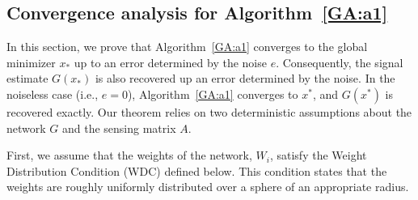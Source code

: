 




\subsection{Convergence analysis for Algorithm~\ref{GA:a1}}

In this section, we prove that Algorithm~\ref{GA:a1} converges to the global minimizer $x_*$ up to an error determined by the noise $e$.  Consequently, the signal estimate $G(x_*)$ is also recovered up an error determined by the noise. In the noiseless case (i.e., $e=0$),  Algorithm~\ref{GA:a1} converges to $x^*$, and $G(x^*)$ is recovered exactly.
Our theorem  relies on two deterministic assumptions about the network $G$ and the sensing matrix $A$.

First, we assume that the weights of the network, $W_i$,  satisfy the Weight Distribution Condition (WDC) defined below.  This condition states that the weights are roughly uniformly distributed over a sphere of an appropriate radius.

